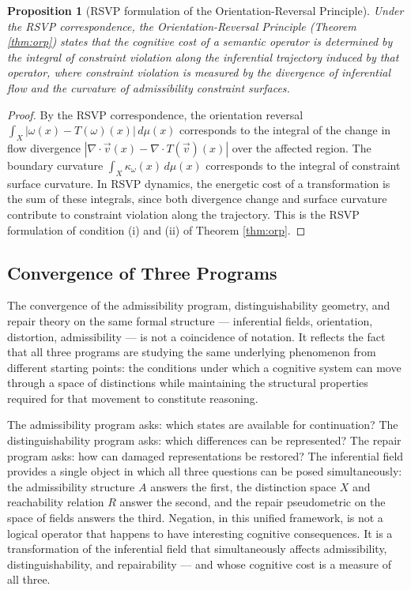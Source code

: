\documentclass[12pt]{article}
\newtheorem{proposition}[theorem]{Proposition}
\theoremstyle{remark}
\begin{document}
\begin{proposition}[RSVP formulation of the Orientation-Reversal
Principle]
\label{prop:rsvp}
Under the RSVP correspondence, the Orientation-Reversal Principle
(Theorem \ref{thm:orp}) states that the cognitive cost of a semantic
operator is determined by the integral of constraint violation along the
inferential trajectory induced by that operator, where constraint
violation is measured by the divergence of inferential flow and the
curvature of admissibility constraint surfaces.
\end{proposition}

\begin{proof}
By the RSVP correspondence, the orientation reversal $\int_X |\omega(x)
- T(\omega)(x)|\, d\mu(x)$ corresponds to the integral of the change in
flow divergence $|\nabla \cdot \vec{v}(x) - \nabla \cdot
T(\vec{v})(x)|$ over the affected region. The boundary curvature
$\int_X \kappa_\omega(x)\, d\mu(x)$ corresponds to the integral of
constraint surface curvature. In RSVP dynamics, the energetic cost of
a transformation is the sum of these integrals, since both divergence
change and surface curvature contribute to constraint violation along
the trajectory. This is the RSVP formulation of condition (i) and (ii)
of Theorem \ref{thm:orp}.
\end{proof}

\subsection{Convergence of Three Programs}

The convergence of the admissibility program, distinguishability
geometry, and repair theory on the same formal structure --- inferential
fields, orientation, distortion, admissibility --- is not a coincidence
of notation. It reflects the fact that all three programs are studying
the same underlying phenomenon from different starting points: the
conditions under which a cognitive system can move through a space of
distinctions while maintaining the structural properties required for
that movement to constitute reasoning.

The admissibility program asks: which states are available for
continuation? The distinguishability program asks: which differences can
be represented? The repair program asks: how can damaged representations
be restored? The inferential field provides a single object in which all
three questions can be posed simultaneously: the admissibility structure
$A$ answers the first, the distinction space $X$ and reachability
relation $R$ answer the second, and the repair pseudometric on the space
of fields answers the third. Negation, in this unified framework, is not
a logical operator that happens to have interesting cognitive
consequences. It is a transformation of the inferential field that
simultaneously affects admissibility, distinguishability, and
repairability --- and whose cognitive cost is a measure of all three.
\end{document}
